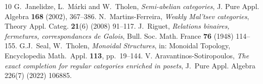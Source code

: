 \documentclass[11pt]{amsart}
\theoremstyle{plain}
\theoremstyle{definition}
\theoremstyle{remark}
\begin{document}
\begin{thebibliography}{10}
 G.~Janelidze, L.~M\'arki and W.~Tholen, \emph{Semi-abelian categories}, J. Pure Appl. Algebra \textbf{168} (2002), 367--386.
 N.~Martins-Ferreira, \emph{Weakly Mal'tsev categories}, Theory Appl. Categ. \textbf{21}(6) (2008) 91--117.
 J.~Riguet, \emph{Relations binaires, fermetures, correspondances de Galois}, Bull. Soc. Math. France \textbf{76} (1948) 114--155.
 G.J.~Seal, W.~Tholen, \emph{Monoidal Structures}, in: Monoidal Topology, Encyclopedia Math.~Appl. \textbf{113}, pp.~19--144.
 V. Aravantinos-Sotiropoulos, \emph{The exact completion for regular categories enriched in posets}, {J.~Pure} Appl. Algebra 226(7) (2022) 106885.


\end{thebibliography}
\end{document}
